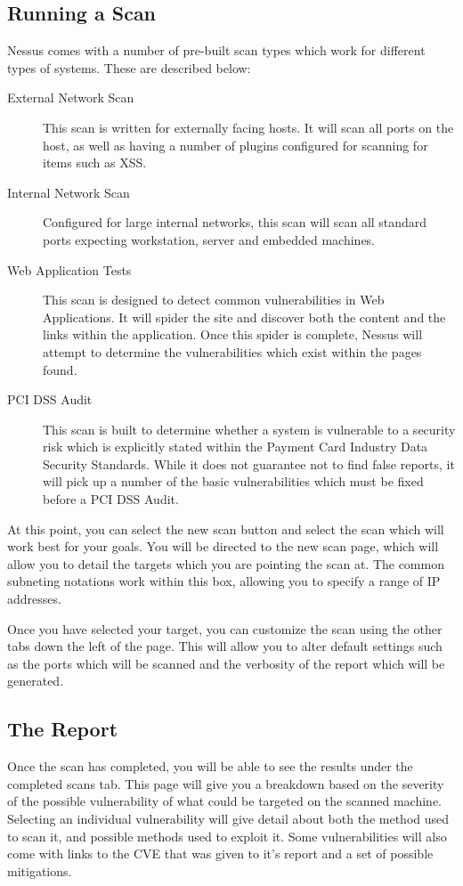 		\subsection{Running a Scan}
			Nessus comes with a number of pre-built scan types which work for different types of systems. 
			These are described below:
			\begin{description}
				\item[External Network Scan] This scan is written for externally facing hosts. 
					It will scan all ports on the host, as well as having a number of plugins configured for scanning for items such as XSS. 
				\item[Internal Network Scan]
					Configured for large internal networks, this scan will scan all standard ports expecting workstation, server and embedded machines. 
				\item[Web Application Tests]
					This scan is designed to detect common vulnerabilities in Web Applications. 
					It will spider the site and discover both the content and the links within the application. 
					Once this spider is complete, Nessus will attempt to determine the vulnerabilities which exist within the pages found. 
				\item[PCI DSS Audit]
					This scan is built to determine whether a system is vulnerable to a security risk which is explicitly stated within the Payment Card Industry Data Security Standards. 
					While it does not guarantee not to find false reports, it will pick up a number of the basic vulnerabilities which must be fixed before a PCI DSS Audit. 
			\end{description}
			At this point, you can select the new scan button and select the scan which will work best for your goals. 
			You will be directed to the new scan page, which will allow you to detail the targets which you are pointing the scan at. 
			The common subneting notations work within this box, allowing you to specify a range of IP addresses. 

			Once you have selected your target, you can customize the scan using the other tabs down the left of the page. 
			This will allow you to alter default settings such as the ports which will be scanned and the verbosity of the report which will be generated. 
		\subsection{The Report}
			Once the scan has completed, you will be able to see the results under the completed scans tab. 
			This page will give you a breakdown based on the severity of the possible vulnerability of what could be targeted on the scanned machine. 
			Selecting an individual vulnerability will give detail about both the method used to scan it, and possible methods used to exploit it. 
			Some vulnerabilities will also come with links to the CVE that was given to it's report and a set of possible mitigations. 

